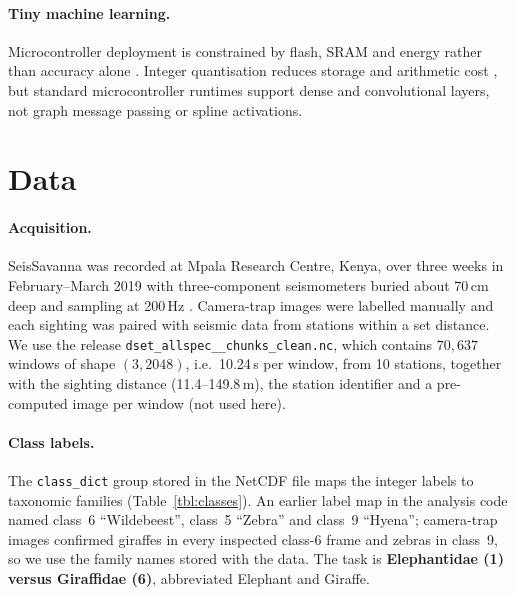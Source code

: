 \documentclass[a4paper,fleqn]{cas-dc}
\begin{document}
\paragraph{Tiny machine learning.}
Microcontroller deployment is constrained by flash, SRAM and energy rather than
accuracy alone \citep{banbury2021,merenda2020}. Integer quantisation reduces storage
and arithmetic cost \citep{jacob2018}, but standard microcontroller runtimes support
dense and convolutional layers, not graph message passing or spline activations.

\section{Data}\label{sec:data}

\paragraph{Acquisition.} SeisSavanna was recorded at Mpala Research Centre, Kenya,
over three weeks in February--March 2019 with three-component seismometers buried
about 70\,cm deep and sampling at 200\,Hz \citep{szenicer2022}. Camera-trap images were
labelled manually and each sighting was paired with seismic data from stations within
a set distance. We use the release \texttt{dset\_\allowbreak allspec\_\_\allowbreak chunks\_\allowbreak clean.nc}, which contains $70{,}637$ windows of
shape $(3,2048)$, i.e.\ 10.24\,s per window, from 10 stations, together with the
sighting distance (11.4--149.8\,m), the station identifier and a pre-computed image
per window (not used here).

\paragraph{Class labels.} The \texttt{class\_dict} group stored in the NetCDF file maps
the integer labels to taxonomic families (Table~\ref{tbl:classes}). An earlier label map
in the analysis code named class~6 ``Wildebeest'', class~5 ``Zebra'' and class~9
``Hyena''; camera-trap images confirmed giraffes in every inspected class-6 frame and
zebras in class~9, so we use the family names stored with the data. The task is
\textbf{Elephantidae (1) versus Giraffidae (6)}, abbreviated Elephant and Giraffe.
\end{document}
